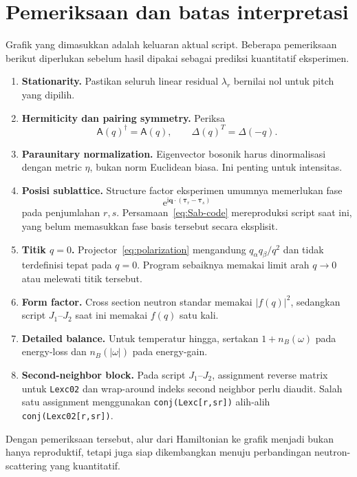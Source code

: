 \documentclass[11pt,a4paper]{article}
\newcommand{\ii}{\mathrm{i}}
\newcommand{\ee}{\mathrm{e}}
\newcommand{\vq}{\bm q}
\newcommand{\mA}{\mathsf A}
\begin{document}
\section{Pemeriksaan dan batas interpretasi}

Grafik yang dimasukkan adalah keluaran aktual script. Beberapa pemeriksaan berikut diperlukan sebelum hasil dipakai sebagai prediksi kuantitatif eksperimen.

\begin{enumerate}
  \item \textbf{Stationarity.} Pastikan seluruh linear residual $\lambda_r$ bernilai nol untuk pitch yang dipilih.
  \item \textbf{Hermiticity dan pairing symmetry.} Periksa
  \begin{equation}
  \mA(q)^\dagger=\mA(q),
  \qquad
  \Delta(q)^T=\Delta(-q).
  \end{equation}
  \item \textbf{Paraunitary normalization.} Eigenvector bosonik harus dinormalisasi dengan metric $\eta$, bukan norm Euclidean biasa. Ini penting untuk intensitas.
  \item \textbf{Posisi sublattice.} Structure factor eksperimen umumnya memerlukan fase
  \begin{equation}
  \ee^{\ii\vq\cdot(\bm\tau_r-\bm\tau_s)}
  \end{equation}
  pada penjumlahan $r,s$. Persamaan~\eqref{eq:Sab-code} mereproduksi script saat ini, yang belum memasukkan fase basis tersebut secara eksplisit.
  \item \textbf{Titik $q=0$.} Projector~\eqref{eq:polarization} mengandung $q_\alpha q_\beta/q^2$ dan tidak terdefinisi tepat pada $q=0$. Program sebaiknya memakai limit arah $q\to0$ atau melewati titik tersebut.
  \item \textbf{Form factor.} Cross section neutron standar memakai $|f(q)|^2$, sedangkan script $J_1$--$J_2$ saat ini memakai $f(q)$ satu kali.
  \item \textbf{Detailed balance.} Untuk temperatur hingga, sertakan $1+n_B(\omega)$ pada energy-loss dan $n_B(|\omega|)$ pada energy-gain.
  \item \textbf{Second-neighbor block.} Pada script $J_1$--$J_2$, assignment reverse matrix untuk \texttt{Lexc02} dan wrap-around indeks second neighbor perlu diaudit. Salah satu assignment menggunakan \texttt{conj(Lexc[r,sr])} alih-alih \texttt{conj(Lexc02[r,sr])}.
\end{enumerate}

Dengan pemeriksaan tersebut, alur dari Hamiltonian ke grafik menjadi bukan hanya reproduktif, tetapi juga siap dikembangkan menuju perbandingan neutron-scattering yang kuantitatif.
\end{document}
